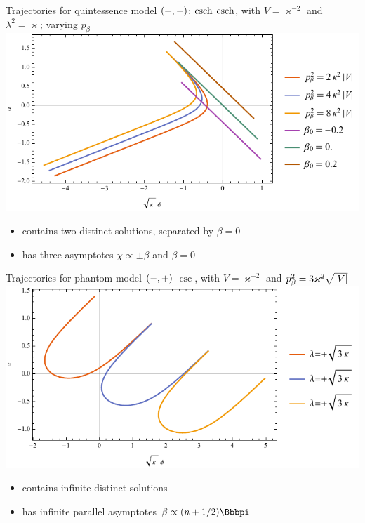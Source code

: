 \documentclass[9pt]{beamer}
\begin{document}
\begin{frame}%
{Trajectories for quintessence model ${\left(+,-\right)}$: $\operatorname{csch}$}%
{$\operatorname{csch}$, with $V = \varkappa^{-2}$ and
$\lambda^2 = \varkappa$; varying $p_\beta$}
\includegraphics[width=\textwidth]{../plots.nb/csch_pbet_l.pdf}
\begin{itemize}
	\item contains two distinct solutions, separated by $\beta = 0$
	\item has three asymptotes $\chi \propto \pm \beta$ and $\beta = 0$
\end{itemize}
\end{frame}

\begin{frame}%
{Trajectories for phantom model ${\left(-,+\right)}$}%
{$\csc$, with $V = \varkappa^{-2}$ and
$p_\beta^2 = 3\varkappa^2\sqrt{{\left|V\right|}}$}
\includegraphics[width=\textwidth]{../plots.nb/csc_lamb_l.pdf}
\begin{itemize}
	\item contains infinite distinct solutions
	\item has infinite parallel asymptotes $\beta \propto \rbr{n+1/2}\pp $
\end{itemize}
\end{frame}
\end{document}
